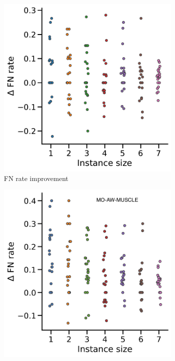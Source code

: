 \begin{figure}[!htbp]
\begin{adjustwidth}{-1.2cm}{}
\begin{subfigure}{0.40\textwidth}
		\end{subfigure}
		\begin{subfigure}{0.40\textwidth} \includegraphics[width=\textwidth]{Figure/delta3} \caption{ FN rate improvement}\label{fig:scatter}\end{subfigure}
		\begin{subfigure}{0.40\textwidth} \includegraphics[width=\textwidth]{Figure/delta4-momuscle.png} 
		\end{subfigure}
		

\end{adjustwidth}
\end{figure}
